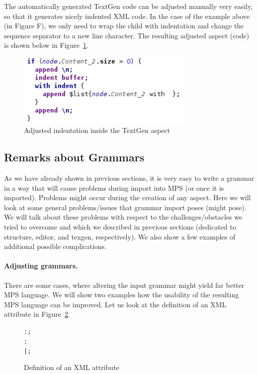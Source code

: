 The automatically generated TextGen code can be adjusted manually very easily, so that it generates nicely indented XML code.
In the case of the example above (in Figure F), we only need to wrap the  child with indentation and change the sequence separator to a new line character.
The resulting adjusted aspect (code) is shown below in Figure~\ref{fig:textgen_adjusted}.

\begin{figure}[t!]
	\centering
	\includegraphics[width=85mm]{./images/textgen_adjusted.png}
	\caption{Adjusted indentation inside the TextGen aspect}
	\label{fig:textgen_adjusted}
\end{figure}

\subsection{Remarks about Grammars}

As we have already shown in previous sections, it is very easy to write a grammar in a way that will cause problems during import into MPS (or once it is imported).
Problems might occur during the creation of any aspect.
Here we will look at some general problems/issues that grammar import poses (might pose).
We will talk about these problems with respect to the challenges/obstacles we tried to overcome and which we described in previous sections (dedicated to structure, editor, and texgen, respectively).
We also show a few examples of additional possible complications.

\paragraph{Adjusting grammars.}
There are some cases, where altering the input grammar might yield far better MPS language.
We will show two examples how the usability of the resulting MPS language can be improved.
Let us look at the definition of an XML attribute in Figure~\ref{fig:xmlattribute}.

\begin{figure}[ht]
\centering
\begin{framed}
\begin{alltt}
	 :  \antlrliteral{=}  ;
	 :  \antlrregex{~["]*} 
	       |  \antlrregex{~[']*}  ;
\end{alltt}
\end{framed}
\caption{Definition of an XML attribute}
\label{fig:xmlattribute}
\end{figure}

